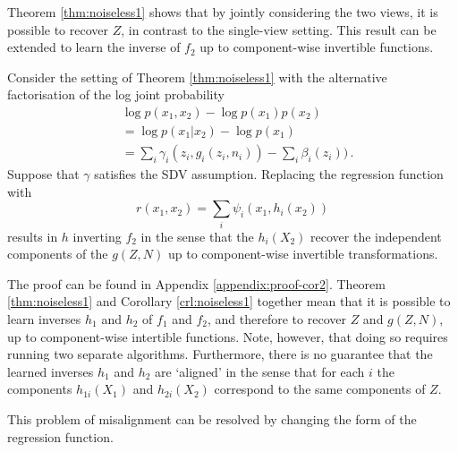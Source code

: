 Theorem \ref{thm:noiseless1} shows that by jointly considering the two views, it is possible to recover $Z$, in contrast to the single-view setting.
This result can be extended to learn the inverse of ${f}_2$ up to component-wise invertible functions.

\medskip

\begin{corollary}
	\label{crl:noiseless1}
	Consider the setting of Theorem \ref{thm:noiseless1} with the alternative factorisation of the log joint probability
	\begin{align}
	&\log p({x}_1, {x}_2) - \log p({x}_1) p({x}_2) \nonumber \\
	&= \log p({x}_1 | {x}_2) - \log p({x}_1)\nonumber \\
	&= \sum_i \gamma_i(z_i, g_i(z_i, n_i)) - \sum_i \beta_i(z_i)) \label{eq:logdens_noiesless_2}\,.
	\end{align}
	Suppose that ${\gamma}$ satisfies the SDV assumption.
	Replacing the regression function with
	\begin{equation*}
	r({x}_{1},{x}_{2})=\sum_{i}\psi_{i}({x}_{1}, h_{i}({x}_{2}))
	\end{equation*}
	results in ${h}$ inverting ${f}_2$ in the sense that the $h_{i}({X}_2)$ recover the independent components of the ${g}({Z}, {N})$ up  to component-wise invertible transformations.
\end{corollary}
The proof can be found in Appendix \ref{appendix:proof-cor2}.
Theorem \ref{thm:noiseless1} and Corollary \ref{crl:noiseless1} together mean that it is possible to learn inverses ${h}_1$ and ${h}_2$ of ${f}_1$ and ${f}_2$, and therefore to recover ${Z}$ and ${g}({Z}, {N})$, up to component-wise intertible functions.
Note, however, that doing so requires running two separate algorithms.
Furthermore, there is no guarantee that the learned inverses ${h}_1$ and ${h}_2$ are `aligned' in the sense that for each $i$ the components ${h}_{1i}({X}_1)$ and ${h}_{2i}({X}_2)$ correspond to the same components of ${Z}$.

This problem of misalignment can be resolved by changing the form of the regression function.

\medskip

